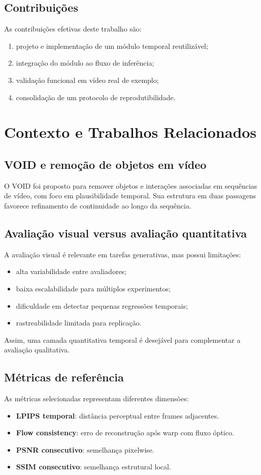\documentclass[conference]{IEEEtran}
\begin{document}
\subsection{Contribuições}
As contribuições efetivas deste trabalho são:
\begin{enumerate}
    \item projeto e implementação de um módulo temporal reutilizável;
    \item integração do módulo ao fluxo de inferência;
    \item validação funcional em vídeo real de exemplo;
    \item consolidação de um protocolo de reprodutibilidade.
\end{enumerate}

\section{Contexto e Trabalhos Relacionados}
\subsection{VOID e remoção de objetos em vídeo}
O VOID foi proposto para remover objetos e interações associadas em sequências de vídeo, com foco em plausibilidade temporal. Sua estrutura em duas passagens favorece refinamento de continuidade ao longo da sequência.

\subsection{Avaliação visual versus avaliação quantitativa}
A avaliação visual é relevante em tarefas generativas, mas possui limitações:
\begin{itemize}
    \item alta variabilidade entre avaliadores;
    \item baixa escalabilidade para múltiplos experimentos;
    \item dificuldade em detectar pequenas regressões temporais;
    \item rastreabilidade limitada para replicação.
\end{itemize}

Assim, uma camada quantitativa temporal é desejável para complementar a avaliação qualitativa.

\subsection{Métricas de referência}
As métricas selecionadas representam diferentes dimensões:
\begin{itemize}
    \item \textbf{LPIPS temporal}: distância perceptual entre frames adjacentes.
    \item \textbf{Flow consistency}: erro de reconstrução após warp com fluxo óptico.
    \item \textbf{PSNR consecutivo}: semelhança pixelwise.
    \item \textbf{SSIM consecutivo}: semelhança estrutural local.
\end{itemize}
\end{document}
